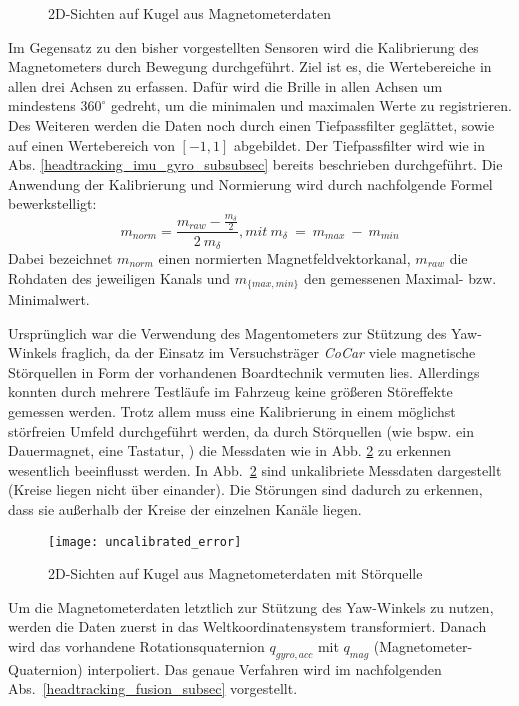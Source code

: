 \begin{figure}[ht]
\centering
{}

\caption[]{2D-Sichten auf Kugel aus Magnetometerdaten}
\label{fig:mag_kugel_plots}
\end{figure}

Im Gegensatz zu den bisher vorgestellten Sensoren wird die Kalibrierung des Magnetometers durch Bewegung durchgeführt.
Ziel ist es, die Wertebereiche in allen drei Achsen zu erfassen.
Dafür wird die Brille in allen Achsen um mindestens $360^\circ$ gedreht, um die minimalen und maximalen Werte zu registrieren. 
Des Weiteren werden die Daten noch durch einen Tiefpassfilter geglättet, sowie auf einen Wertebereich von $[-1,1]$ abgebildet.
Der Tiefpassfilter wird wie in Abs. \ref{headtracking_imu_gyro_subsubsec} bereits beschrieben durchgeführt. 
Die Anwendung der Kalibrierung und Normierung wird durch nachfolgende Formel bewerkstelligt:
\begin{equation}
    m_{norm} = \frac{m_{raw}- \frac{m_{\delta}}{2}}{2~m_{\delta}}, {\scriptstyle mit~m_{\delta}~=~m_{max}~-~m_{min}}
\end{equation}
Dabei bezeichnet $m_{norm}$ einen normierten Magnetfeldvektorkanal, $m_{raw}$ die Rohdaten des jeweiligen Kanals und $m_{\lbrace max, min\rbrace}$ den gemessenen Maximal- bzw. Minimalwert.

Ursprünglich war die Verwendung des Magentometers zur Stützung des Yaw-Winkels fraglich, da der Einsatz im Versuchsträger \emph{CoCar} viele magnetische Störquellen in Form der vorhandenen Boardtechnik vermuten lies. 
Allerdings konnten durch mehrere Testläufe im Fahrzeug keine größeren Störeffekte gemessen werden. Trotz allem muss eine Kalibrierung in einem möglichst störfreien Umfeld durchgeführt werden, da durch Störquellen (wie bspw. ein Dauermagnet, eine Tastatur, \oae) die Messdaten wie in Abb. \ref{fig:uncalibrated_error} zu erkennen wesentlich beeinflusst werden. In Abb.~\ref{fig:uncalibrated_error} sind unkalibriete Messdaten dargestellt (Kreise liegen nicht über einander). Die Störungen sind dadurch zu erkennen, dass sie außerhalb der Kreise der einzelnen Kanäle liegen.

\begin{figure}[ht]
	\centering
    \texttt{[image: uncalibrated\_error]}
	\caption[]{2D-Sichten auf Kugel aus Magnetometerdaten mit Störquelle}
	\label{fig:uncalibrated_error}
\end{figure}

Um die Magnetometerdaten letztlich zur Stützung des Yaw-Winkels zu nutzen, werden die Daten zuerst in das Weltkoordinatensystem transformiert.
Danach wird das vorhandene Rotationsquaternion $q_{gyro,acc}$ mit $q_{mag}$ (Magnetometer-Quaternion) interpoliert.
Das genaue Verfahren wird im nachfolgenden Abs.~\ref{headtracking_fusion_subsec} vorgestellt.
